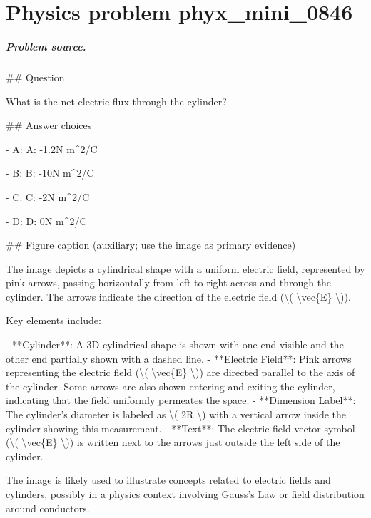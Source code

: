 
\chapter{Physics problem phyx\_mini\_0846}
\label{ch:PhyXMiniProblems_problem_phyx_mini_0846}

\paragraph{Problem source.}
\#\# Question

What is the net electric flux through the cylinder?

\#\# Answer choices

- A: A: -1.2N m\textasciicircum{}2/C

- B: B: -10N m\textasciicircum{}2/C

- C: C: -2N m\textasciicircum{}2/C

- D: D: 0N m\textasciicircum{}2/C

\#\# Figure caption (auxiliary; use the image as primary evidence)

The image depicts a cylindrical shape with a uniform electric field, represented by pink arrows, passing horizontally from left to right across and through the cylinder. The arrows indicate the direction of the electric field (\textbackslash{}( \textbackslash{}vec\{E\} \textbackslash{})).

Key elements include:

- **Cylinder**: A 3D cylindrical shape is shown with one end visible and the other end partially shown with a dashed line.
- **Electric Field**: Pink arrows representing the electric field (\textbackslash{}( \textbackslash{}vec\{E\} \textbackslash{})) are directed parallel to the axis of the cylinder. Some arrows are also shown entering and exiting the cylinder, indicating that the field uniformly permeates the space.
- **Dimension Label**: The cylinder’s diameter is labeled as \textbackslash{}( 2R \textbackslash{}) with a vertical arrow inside the cylinder showing this measurement.
- **Text**: The electric field vector symbol (\textbackslash{}( \textbackslash{}vec\{E\} \textbackslash{})) is written next to the arrows just outside the left side of the cylinder.

The image is likely used to illustrate concepts related to electric fields and cylinders, possibly in a physics context involving Gauss's Law or field distribution around conductors.

